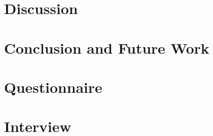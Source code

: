 \section{Discussion}


\section{Conclusion and Future Work}


\begin{acks}

\end{acks}




\appendix
\section{Questionnaire}

\section{Interview}
